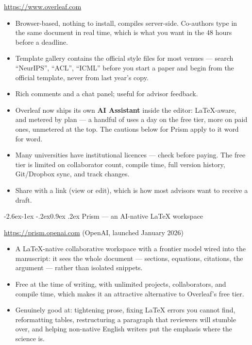 \documentclass[11pt,a4paper]{article}
\makeatletter
\renewcommand\subsection{\@startsection{subsection}{2}{\z@}%
  {-2.6ex\@plus -1ex \@minus -.2ex}{0.9ex \@plus .2ex}%
  {\normalfont\large\bfseries\color{brandlight}}}
\makeatother
\begin{document}
\url{https://www.overleaf.com}

\begin{itemize}
  \item Browser-based, nothing to install, compiles server-side. Co-authors
        type in the same document in real time, which is what you want in the
        48 hours before a deadline.
  \item Template gallery contains the official style files for most venues
        --- search ``NeurIPS'', ``ACL'', ``ICML'' before you start a paper and
        begin from the official template, never from last year's copy.
  \item Rich comments and a chat panel; useful for advisor feedback.
  \item Overleaf now ships its own \textbf{AI Assistant} inside the editor:
        LaTeX-aware, and metered by plan --- a handful of uses a day on the
        free tier, more on paid ones, unmetered at the top. The cautions below
        for Prism apply to it word for word.
  \item Many universities have institutional licences --- check before paying.
        The free tier is limited on collaborator count, compile time, full
        version history, Git/Dropbox sync, and track changes.
  \item Share with a link (view or edit), which is how most advisors want to
        receive a draft.
\end{itemize}

\subsection{Prism --- an AI-native LaTeX workspace}

\url{https://prism.openai.com} \quad (OpenAI, launched January 2026)

\begin{itemize}
  \item A LaTeX-native collaborative workspace with a frontier model wired
        into the manuscript: it sees the whole document --- sections,
        equations, citations, the argument --- rather than isolated snippets.
  \item Free at the time of writing, with unlimited projects, collaborators, and compile
        time, which makes it an attractive alternative to Overleaf's free
        tier.
  \item Genuinely good at: tightening prose, fixing LaTeX errors you cannot
        find, reformatting tables, restructuring a paragraph that reviewers
        will stumble over, and helping non-native English writers put the
        emphasis where the science is.
\end{itemize}
\end{document}
